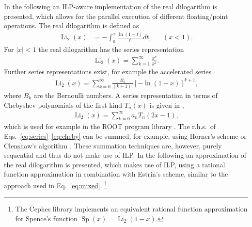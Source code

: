 \documentclass[10pt,DIV16,twocolumn,numbers=noenddot]{scrartcl}
\newcommand{\Li}{\operatorname{Li}_2}
\begin{document}
In the following an ILP-aware implementation of the real dilogarithm
is presented, which allows for the parallel execution of different
floating\-/point operations.  The real dilogarithm is defined as
%
\begin{align}
  \Li(x) &= -\int_0^x \frac{\ln(1-t)}{t}dt, &
  &(x<1).
\end{align}
%
For $|x|<1$ the real dilogarithm has the series representation
%
\begin{align}
  \Li(x) = \sum_{k=1}^\infty \frac{x^k}{k^2}.
  \label{eq:series}
\end{align}
%
Further series representations exist, for example the accelerated
series
%
\begin{align}
  \Li(x) = \sum_{k=0}^\infty \frac{B_k}{(k+1)!} [-\ln(1-x)]^{k+1},
\end{align}
%
where $B_k$ are the Bernoulli numbers.  A series representation in
terms of Chebyshev polynomials of the first kind $T_n(x)$ is given in
\cite{luke},
%
\begin{align}
  \Li(x) = \sum_{k=0}^\infty a_n T_n(2x-1),
  \label{eq:cheby}
\end{align}
%
which is used for example in the ROOT program library \cite{root}.
The r.h.s.\ of Eqs.~\eqref{eq:series}--\eqref{eq:cheby} can be summed,
for example, using Horner's scheme or Clenshaw's algorithm
\cite{clenshaw}.  These summation techniques are, however, purely
sequential and thus do not make use of ILP.  In the following an
approximation of the real dilogarithm is presented, which makes use of
ILP, using a rational function approximation in combination with
Estrin's scheme, similar to the approach used in
Eq.~\eqref{eq:mixed}.%
\footnote{The Cephes library \cite{cephes} implements an equivalent
  rational function approximation for Spence's function
  $\operatorname{Sp}(x)=\Li(1-x)$.}
\end{document}
